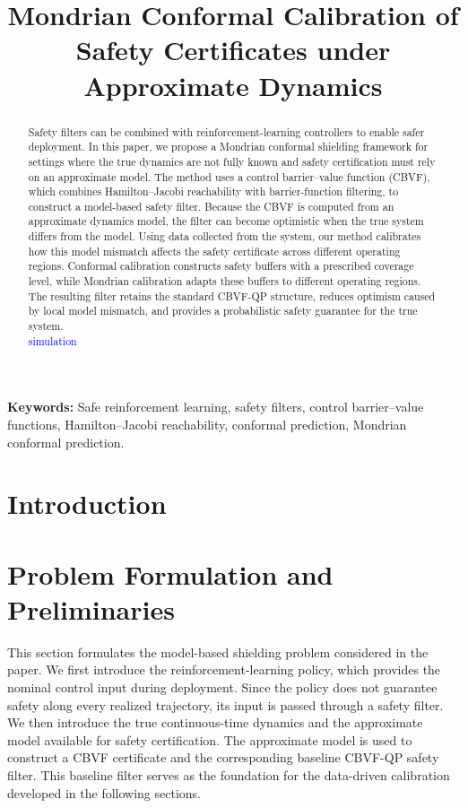 \documentclass[letterpaper,10pt,conference]{ieeeconf}
\title{Mondrian Conformal Calibration of Safety Certificates under Approximate Dynamics}
\author{}
\begin{document}
\maketitle

\begin{abstract}
Safety filters can be combined with reinforcement-learning controllers to enable safer deployment. In this paper, we propose a Mondrian conformal shielding framework for settings where the true dynamics are not fully known and safety certification must rely on an approximate model. The method uses a control barrier–value function (CBVF), which combines Hamilton–Jacobi reachability with barrier-function filtering, to construct a model-based safety filter. Because the CBVF is computed from an approximate dynamics model, the filter can become optimistic when the true system differs from the model. Using data collected from the system, our method calibrates how this model mismatch affects the safety certificate across different operating regions. Conformal calibration constructs safety buffers with a prescribed coverage level, while Mondrian calibration adapts these buffers to different operating regions. The resulting filter retains the standard CBVF-QP structure, reduces optimism caused by local model mismatch, and provides a probabilistic safety guarantee for the true system.
\\\textcolor{blue}{simulation}
\end{abstract}
\noindent\textbf{Keywords:} Safe reinforcement learning, safety filters,
control barrier--value functions, Hamilton--Jacobi reachability, conformal
prediction, Mondrian conformal prediction.
\section{Introduction}

\section{Problem Formulation and Preliminaries}


This section formulates the model-based shielding problem considered in the
paper. We first introduce the reinforcement-learning policy, which provides the
nominal control input during deployment. Since the policy does not guarantee
safety along every realized trajectory, its input is passed through a safety
filter. We then introduce the true continuous-time dynamics and the approximate
model available for safety certification. The approximate model is used to
construct a CBVF certificate and the corresponding baseline CBVF-QP safety
filter. This baseline filter serves as the foundation for the data-driven calibration
developed in the following sections.
\end{document}
